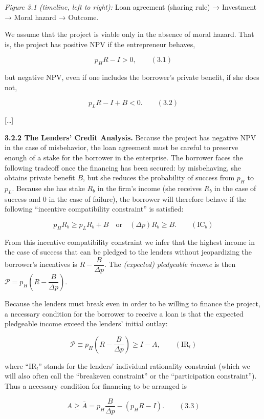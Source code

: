 \documentclass[11pt,a4paper]{article}
\begin{document}
\emph{Figure 3.1 (timeline, left to right):} Loan agreement (sharing rule) → Investment → Moral
hazard → Outcome.

We assume that the project is viable only in the absence of moral hazard. That is, the project has
positive NPV if the entrepreneur behaves,

\[p_H R - I > 0, \qquad (3.1)\]

but negative NPV, even if one includes the borrower's private benefit, if she does not,

\[p_L R - I + B < 0. \qquad (3.2)\]

{[}\ldots{]}

\textbf{3.2.2 The Lenders' Credit Analysis.} Because the project has negative NPV in the case of
misbehavior, the loan agreement must be careful to preserve enough of a stake for the borrower in
the enterprise. The borrower faces the following tradeoff once the financing has been secured: by
misbehaving, she obtains private benefit \(B\), but she reduces the probability of success from
\(p_H\) to \(p_L\). Because she has stake \(R_b\) in the firm's income (she receives \(R_b\) in the
case of success and 0 in the case of failure), the borrower will therefore behave if the following
``incentive compatibility constraint'' is satisfied:

\[p_H R_b \geqslant p_L R_b + B \quad \text{or} \quad (\Delta p) R_b \geqslant B. \qquad (\text{IC}_b)\]

From this incentive compatibility constraint we infer that the highest income in the case of success
that can be pledged to the lenders without jeopardizing the borrower's incentives is
\(R - \dfrac{B}{\Delta p}\). The \emph{(expected) pledgeable income} is then
\(\mathcal{P} = p_H\left(R - \dfrac{B}{\Delta p}\right)\).

Because the lenders must break even in order to be willing to finance the project, a necessary
condition for the borrower to receive a loan is that the expected pledgeable income exceed the
lenders' initial outlay:

\[\mathcal{P} \equiv p_H\left(R - \frac{B}{\Delta p}\right) \geqslant I - A, \qquad (\text{IR}_l)\]

where ``IR\(_l\)'' stands for the lenders' individual rationality constraint (which we will also
often call the ``breakeven constraint'' or the ``participation constraint''). Thus a necessary
condition for financing to be arranged is

\[A \geqslant \bar{A} = p_H \frac{B}{\Delta p} - (p_H R - I). \qquad (3.3)\]
\end{document}
